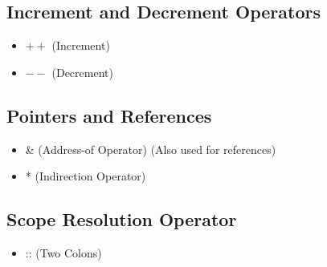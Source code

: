 \documentclass{report}
\begin{document}
    \begin{minipage}[t]{0.47\textwidth}
        \subsection{Increment and Decrement Operators}
        \begin{itemize}
          \item \( ++ \) (Increment)
          \item \( -- \) (Decrement)
        \end{itemize}
        \subsection{Pointers and References}
        \begin{itemize}
            \item \& (Address-of Operator) (Also used for references)
            \item * (Indirection Operator)
        \end{itemize}
    \end{minipage}
    \bigbreak \noindent 
    \begin{minipage}[]{0.47\textwidth}
        \subsection{Scope Resolution Operator}
        \begin{itemize}
            \item :: (Two Colons)
        \end{itemize}
    
    \end{minipage}


    \bigbreak \noindent 

    \pagebreak \bigbreak \noindent 
\end{document}
